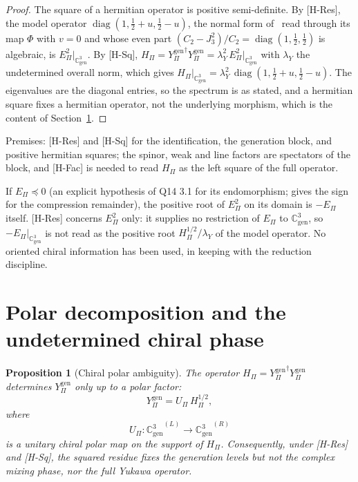 \documentclass[11pt]{article}
\newtheorem{proposition}{Proposition}
\theoremstyle{definition}
\theoremstyle{remark}
\newcommand{\Jthree}{J_{3}}
\newcommand{\Cgen}{\mathbb{C}^{3}_{\mathrm{gen}}}
\newcommand{\Epi}{E_{\Pi}}
\newcommand{\GL}{{\Cgen}^{(L)}}
\newcommand{\GR}{{\Cgen}^{(R)}}
\newcommand{\Ygen}{{Y^{\mathrm{gen}}_{\Pi}}}
\newcommand{\Hpi}{H_{\Pi}}
\newcommand{\Upi}{U_{\Pi}}
\newcommand{\lamY}{\lambda_{Y}}
\newcommand{\diag}{\operatorname{diag}}
\begin{document}
    \begin{proof}
      The square of a hermitian operator is positive semi-definite.
      By [H-Res], the model operator $\diag(1, \tfrac12 + u, \tfrac12 - u)$, the normal form of~\cite{Beau2026prs}
      read through its map $\Phi$ with $v = 0$ and whose even part $(C_{2} - \Jthree^{2})/C_{2} = \diag(1, \tfrac12, \tfrac12)$ is algebraic, is
      $\Epi^{2}|_{\Cgen}$.
      By [H-Sq], $\Hpi = \Ygen^{\dagger}\Ygen = \lamY^{2}\,\Epi^{2}|_{\Cgen}$ with $\lamY$ the undetermined overall
      norm,
      which gives $\Hpi|_{\Cgen} = \lamY^{2}\,\diag(1, \tfrac12 + u, \tfrac12 - u)$.
      The eigenvalues are the diagonal entries, so the spectrum is as stated, and a hermitian square fixes a
      hermitian operator, not the underlying morphism, which is the content of Section~\ref{sec:polar}.
    \end{proof}

    Premises: [H-Res] and [H-Sq] for the identification, the generation block, and positive hermitian squares;
    the spinor, weak and line factors are spectators of the block, and [H-Fac] is needed to read $\Hpi$ as the left
    square of the full operator.

    If $\Epi \preceq 0$ (an explicit hypothesis of Q14 3.1 for its endomorphism; \cite{Beau2026prs} gives the sign
    for the compression remainder), the positive root of $\Epi^{2}$ on its domain is $-\Epi$ itself.
    [H-Res] concerns $\Epi^{2}$ only: it supplies no restriction of $\Epi$ to $\Cgen$, so $-\Epi|_{\Cgen}$ is not read
    as the positive root $\Hpi^{1/2}/\lamY$ of the model operator.
    No oriented chiral information has been used, in keeping with the reduction discipline.

  \section{Polar decomposition and the undetermined chiral phase}
    \label{sec:polar}

    \begin{proposition}[Chiral polar ambiguity]
      \label{prop:polar-ambiguity}
      The operator $\Hpi = \Ygen^{\dagger}\Ygen$ determines $\Ygen$ only up to a polar factor:
      \[
        \Ygen = \Upi\,\Hpi^{1/2} ,
      \]
      where
      \[
        \Upi : \GL \longrightarrow \GR
      \]
      is a unitary chiral polar map on the support of $\Hpi$.
      Consequently, under [H-Res] and [H-Sq], the squared residue fixes the generation levels but not
      the complex mixing phase, nor the full Yukawa operator.
    \end{proposition}
\end{document}
